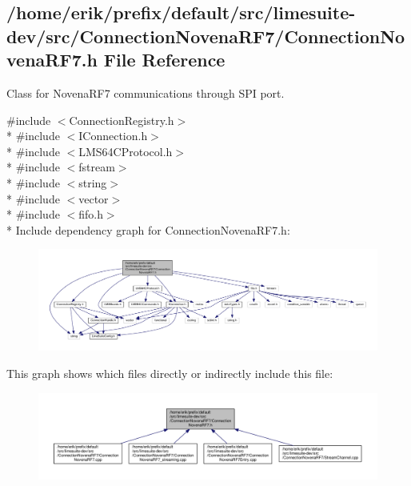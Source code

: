 \subsection{/home/erik/prefix/default/src/limesuite-\/dev/src/\+Connection\+Novena\+R\+F7/\+Connection\+Novena\+R\+F7.h File Reference}
\label{ConnectionNovenaRF7_8h}


Class for Novena\+R\+F7 communications through S\+PI port.  


{\ttfamily \#include $<$Connection\+Registry.\+h$>$}\\*
{\ttfamily \#include $<$I\+Connection.\+h$>$}\\*
{\ttfamily \#include $<$L\+M\+S64\+C\+Protocol.\+h$>$}\\*
{\ttfamily \#include $<$fstream$>$}\\*
{\ttfamily \#include $<$string$>$}\\*
{\ttfamily \#include $<$vector$>$}\\*
{\ttfamily \#include $<$fifo.\+h$>$}\\*
Include dependency graph for Connection\+Novena\+R\+F7.\+h\+:
\nopagebreak
\begin{figure}[H]
\begin{center}
\leavevmode
\includegraphics[width=350pt]{d8/da1/ConnectionNovenaRF7_8h__incl}
\end{center}
\end{figure}
This graph shows which files directly or indirectly include this file\+:
\nopagebreak
\begin{figure}[H]
\begin{center}
\leavevmode
\includegraphics[width=350pt]{d9/d51/ConnectionNovenaRF7_8h__dep__incl}
\end{center}
\end{figure}
